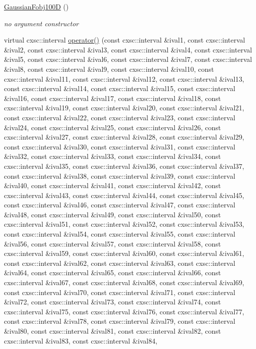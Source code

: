 \begin{DoxyCompactItemize}
\item 
\hyperlink{classGaussianFobj100D_a6bc414d626ec0a17efb4489c6fb75e3f}{\-Gaussian\-Fobj100\-D} ()
\begin{DoxyCompactList}\small\item\em no argument constructor \end{DoxyCompactList}\item 
virtual cxsc\-::interval \hyperlink{classGaussianFobj100D_a4f1b3477ee51ae239b80b3a77a89e639}{operator()} (const cxsc\-::interval \&ival1, const cxsc\-::interval \&ival2, const cxsc\-::interval \&ival3, const cxsc\-::interval \&ival4, const cxsc\-::interval \&ival5, const cxsc\-::interval \&ival6, const cxsc\-::interval \&ival7, const cxsc\-::interval \&ival8, const cxsc\-::interval \&ival9, const cxsc\-::interval \&ival10, const cxsc\-::interval \&ival11, const cxsc\-::interval \&ival12, const cxsc\-::interval \&ival13, const cxsc\-::interval \&ival14, const cxsc\-::interval \&ival15, const cxsc\-::interval \&ival16, const cxsc\-::interval \&ival17, const cxsc\-::interval \&ival18, const cxsc\-::interval \&ival19, const cxsc\-::interval \&ival20, const cxsc\-::interval \&ival21, const cxsc\-::interval \&ival22, const cxsc\-::interval \&ival23, const cxsc\-::interval \&ival24, const cxsc\-::interval \&ival25, const cxsc\-::interval \&ival26, const cxsc\-::interval \&ival27, const cxsc\-::interval \&ival28, const cxsc\-::interval \&ival29, const cxsc\-::interval \&ival30, const cxsc\-::interval \&ival31, const cxsc\-::interval \&ival32, const cxsc\-::interval \&ival33, const cxsc\-::interval \&ival34, const cxsc\-::interval \&ival35, const cxsc\-::interval \&ival36, const cxsc\-::interval \&ival37, const cxsc\-::interval \&ival38, const cxsc\-::interval \&ival39, const cxsc\-::interval \&ival40, const cxsc\-::interval \&ival41, const cxsc\-::interval \&ival42, const cxsc\-::interval \&ival43, const cxsc\-::interval \&ival44, const cxsc\-::interval \&ival45, const cxsc\-::interval \&ival46, const cxsc\-::interval \&ival47, const cxsc\-::interval \&ival48, const cxsc\-::interval \&ival49, const cxsc\-::interval \&ival50, const cxsc\-::interval \&ival51, const cxsc\-::interval \&ival52, const cxsc\-::interval \&ival53, const cxsc\-::interval \&ival54, const cxsc\-::interval \&ival55, const cxsc\-::interval \&ival56, const cxsc\-::interval \&ival57, const cxsc\-::interval \&ival58, const cxsc\-::interval \&ival59, const cxsc\-::interval \&ival60, const cxsc\-::interval \&ival61, const cxsc\-::interval \&ival62, const cxsc\-::interval \&ival63, const cxsc\-::interval \&ival64, const cxsc\-::interval \&ival65, const cxsc\-::interval \&ival66, const cxsc\-::interval \&ival67, const cxsc\-::interval \&ival68, const cxsc\-::interval \&ival69, const cxsc\-::interval \&ival70, const cxsc\-::interval \&ival71, const cxsc\-::interval \&ival72, const cxsc\-::interval \&ival73, const cxsc\-::interval \&ival74, const cxsc\-::interval \&ival75, const cxsc\-::interval \&ival76, const cxsc\-::interval \&ival77, const cxsc\-::interval \&ival78, const cxsc\-::interval \&ival79, const cxsc\-::interval \&ival80, const cxsc\-::interval \&ival81, const cxsc\-::interval \&ival82, const cxsc\-::interval \&ival83, const cxsc\-::interval \&ival84, 
\end{DoxyCompactItemize}
